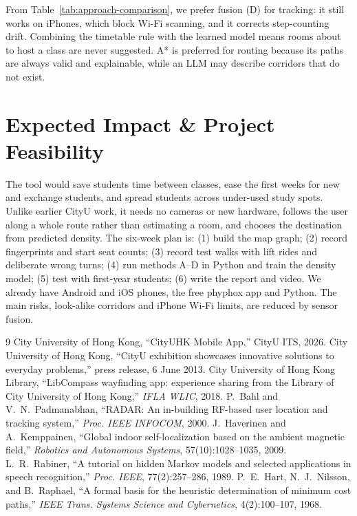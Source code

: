 \documentclass{article}
\begin{document}
From Table~\ref{tab:approach-comparison}, we prefer fusion (D) for tracking: it still works on iPhones, which block Wi-Fi scanning, and it corrects step-counting drift. Combining the timetable rule with the learned model means rooms about to host a class are never suggested. A* is preferred for routing because its paths are always valid and explainable, while an LLM may describe corridors that do not exist.

\section{Expected Impact \& Project Feasibility}
The tool would save students time between classes, ease the first weeks for new and exchange students, and spread students across under-used study spots. Unlike earlier CityU work, it needs no cameras or new hardware, follows the user along a whole route rather than estimating a room, and chooses the destination from predicted density. The six-week plan is: (1) build the map graph; (2) record fingerprints and start seat counts; (3) record test walks with lift rides and deliberate wrong turns; (4) run methods A--D in Python and train the density model; (5) test with first-year students; (6) write the report and video. We already have Android and iOS phones, the free phyphox app and Python. The main risks, look-alike corridors and iPhone Wi-Fi limits, are reduced by sensor fusion.

\begin{thebibliography}{9}
\footnotesize
{}
City University of Hong Kong, ``CityUHK Mobile App,'' CityU ITS, 2026.
City University of Hong Kong, ``CityU exhibition showcases innovative solutions to everyday problems,'' press release, 6 June 2013.
City University of Hong Kong Library, ``LibCompass wayfinding app: experience sharing from the Library of City University of Hong Kong,'' \emph{IFLA WLIC}, 2018.
P.~Bahl and V.~N.~Padmanabhan, ``RADAR: An in-building RF-based user location and tracking system,'' \emph{Proc. IEEE INFOCOM}, 2000.
J.~Haverinen and A.~Kemppainen, ``Global indoor self-localization based on the ambient magnetic field,'' \emph{Robotics and Autonomous Systems}, 57(10):1028--1035, 2009.
L.~R.~Rabiner, ``A tutorial on hidden Markov models and selected applications in speech recognition,'' \emph{Proc. IEEE}, 77(2):257--286, 1989.
P.~E.~Hart, N.~J.~Nilsson, and B.~Raphael, ``A formal basis for the heuristic determination of minimum cost paths,'' \emph{IEEE Trans. Systems Science and Cybernetics}, 4(2):100--107, 1968.
\end{thebibliography}
\end{document}
